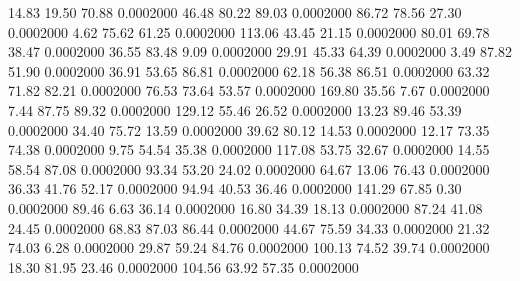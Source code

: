   14.83   19.50   70.88   0.0002000
  46.48   80.22   89.03   0.0002000
  86.72   78.56   27.30   0.0002000
   4.62   75.62   61.25   0.0002000
 113.06   43.45   21.15   0.0002000
  80.01   69.78   38.47   0.0002000
  36.55   83.48    9.09   0.0002000
  29.91   45.33   64.39   0.0002000
   3.49   87.82   51.90   0.0002000
  36.91   53.65   86.81   0.0002000
  62.18   56.38   86.51   0.0002000
  63.32   71.82   82.21   0.0002000
  76.53   73.64   53.57   0.0002000
 169.80   35.56    7.67   0.0002000
   7.44   87.75   89.32   0.0002000
 129.12   55.46   26.52   0.0002000
  13.23   89.46   53.39   0.0002000
  34.40   75.72   13.59   0.0002000
  39.62   80.12   14.53   0.0002000
  12.17   73.35   74.38   0.0002000
   9.75   54.54   35.38   0.0002000
 117.08   53.75   32.67   0.0002000
  14.55   58.54   87.08   0.0002000
  93.34   53.20   24.02   0.0002000
  64.67   13.06   76.43   0.0002000
  36.33   41.76   52.17   0.0002000
  94.94   40.53   36.46   0.0002000
 141.29   67.85    0.30   0.0002000
  89.46    6.63   36.14   0.0002000
  16.80   34.39   18.13   0.0002000
  87.24   41.08   24.45   0.0002000
  68.83   87.03   86.44   0.0002000
  44.67   75.59   34.33   0.0002000
  21.32   74.03    6.28   0.0002000
  29.87   59.24   84.76   0.0002000
 100.13   74.52   39.74   0.0002000
  18.30   81.95   23.46   0.0002000
 104.56   63.92   57.35   0.0002000
